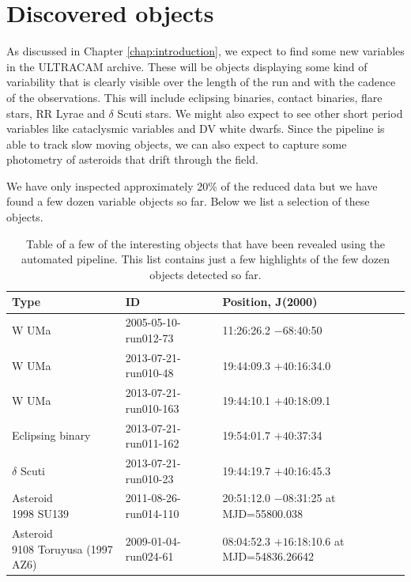 \section{Discovered objects}
As discussed in Chapter \ref{chap:introduction}, we expect to find some new variables in the ULTRACAM archive. These will be objects displaying some kind of variability that is clearly visible over the length of the run and with the cadence of the observations. This will include eclipsing binaries, contact binaries, flare stars, RR Lyrae and $\delta$ Scuti stars. We might also expect to see other short period variables like cataclysmic variables and DV white dwarfs. Since the pipeline is able to track slow moving objects, we can also expect to capture some photometry of asteroids that drift through the field.   

We have only inspected approximately 20\% of the reduced data but we have found a few dozen variable objects so far. Below we list a selection of these objects. 

\begin{table}
  \caption{Table of a few of the interesting objects that have been revealed using the automated pipeline. This list contains just a few highlights of the few dozen objects detected so far.}
  \begin{tabularx}{15.4cm}{ l  l  l }
  \hline
  Type& ID & Position, J(2000) \\
  \hline
    {W UMa} & 2005-05-10-run012-73 & 11:26:26.2 $-68$:40:50 \\
    {W UMa} & 2013-07-21-run010-48 & 19:44:09.3 $+40$:16:34.0\\
    {W UMa} & 2013-07-21-run010-163 & 19:44:10.1 $+40$:18:09.1\\
    Eclipsing binary & 2013-07-21-run011-162 & 19:54:01.7 $+40$:37:34\\
    $\delta$ Scuti & 2013-07-21-run010-23 & 19:44:19.7 $+40$:16:45.3\\
  \hline
    \parbox[c]{5cm}{Asteroid\\1998 SU139\\ } & \parbox[c]{5cm}{2011-08-26-run014-110\\  } & \parbox[c]{5cm}{20:51:12.0 $-08$:31:25\\ at MJD=55800.038}\\
    \parbox[c]{5cm}{Asteroid\\9108 Toruyusa (1997 AZ6) } & \parbox[c]{5cm}{2009-01-04-run024-61\\}& \parbox[c]{5cm}{08:04:52.3 $+16$:18:10.6\\at  MJD=54836.26642}\\

  \hline
  \end{tabularx}
  \label{tab:newobjects}
\end{table}


